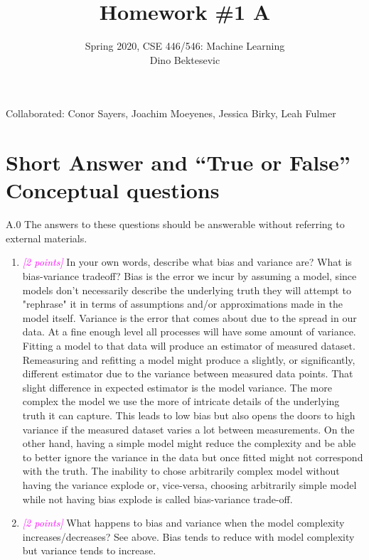 \documentclass{article}
\date{{}}
\newcommand{\1}{\mathbf{1}}
\newcommand{\points}[1]{\small\textcolor{magenta}{\emph{[#1 points]}} \normalsize}
\begin{document}
\title{Homework \#1 A}
\author{\normalsize{Spring 2020, CSE 446/546: Machine Learning}\\
\normalsize{Dino Bektesevic}}
\maketitle

Collaborated: Conor Sayers, Joachim Moeyenes, Jessica Birky, Leah Fulmer

\section*{Short Answer and “True or False” Conceptual questions}
A.0 The answers to these questions should be answerable without referring to external materials.
\begin{enumerate}
    \item \points{2} In your own words, describe what bias and variance are? What is bias-variance tradeoff? \newline
    Bias is the error we incur by assuming a model, since models don't necessarily describe the underlying truth they will attempt to "rephrase" it in terms of assumptions and/or approximations made in the model itself. Variance is the error that comes about due to the spread in our data. At a fine enough level all processes will have some amount of variance. Fitting a model to that data will produce an estimator of measured dataset. Remeasuring and refitting a model might produce a slightly, or significantly, different estimator due to the variance between measured data points. That slight difference in expected estimator is the model variance. \newline
    The more complex the model we use the more of intricate details of the underlying truth it can capture. This leads to low bias but also opens the doors to high variance if the measured dataset varies a lot between measurements. On the other hand, having a simple model might reduce the complexity and be able to better ignore the variance in the data but once fitted might not correspond with the truth. The inability to chose arbitrarily complex model without having the variance explode or, vice-versa, choosing arbitrarily simple model while not having bias explode is called bias-variance trade-off.

    \item \points{2} What happens to bias and variance when the model complexity increases/decreases? \newline
    See above. Bias tends to reduce with model complexity but variance tends to increase. 


\end{enumerate}
\end{document}
